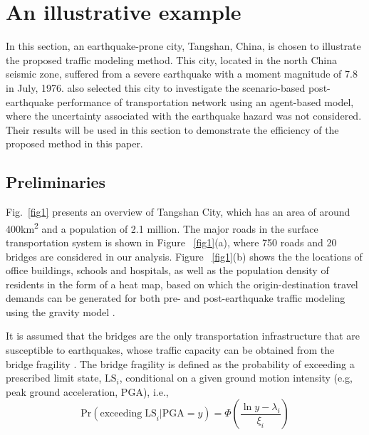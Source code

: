 \documentclass[review,11pt,nonatbib]{elsarticle}
\begin{document}
\section{An illustrative example}
In this section, an earthquake-prone city, Tangshan, China, is chosen to illustrate the proposed traffic modeling method. This city, located in the north China seismic zone, suffered from a severe earthquake with a moment magnitude of 7.8 in July, 1976.  \citet{feng2017post} also selected this city to investigate the scenario-based post-earthquake performance of transportation network using an agent-based model, where the uncertainty associated with the earthquake hazard was not considered. Their results will be used in this section to demonstrate the efficiency of the proposed method in this paper.
\subsection{Preliminaries}
Fig.~\ref{fig1} presents an overview of Tangshan City, which has an area of around 400km\textsuperscript{2} and a population of 2.1 million. The major roads in the surface transportation system is shown in Figure ~\ref{fig1}(a), where 750 roads and 20 bridges are considered in our analysis. Figure ~\ref{fig1}(b) shows the the locations of office buildings, schools and hospitals, as well as the population density of residents in the form of a heat map, based on which the origin-destination travel demands can be generated for both pre- and post-earthquake traffic modeling using the gravity model \citep{moriarty2007modeling,chang2012post}.
\par  It is assumed that the bridges are the only transportation infrastructure that are susceptible to earthquakes, whose traffic capacity can be obtained from the bridge fragility \citep{padgett2009retrofitted}. The bridge fragility is defined as the probability of exceeding a prescribed limit state, $\mathrm{LS}_i$, conditional on a given ground motion intensity (e.g, peak ground acceleration, PGA), i.e.,
\begin{equation}\label{eq PLSi}
\mathrm{Pr}(\mathrm{exceeding\;LS}_i|\mathrm{PGA}=y)=\Phi\left(\frac{\ln y - \lambda_i}{\xi_i}\right)
\end{equation}
\end{document}
